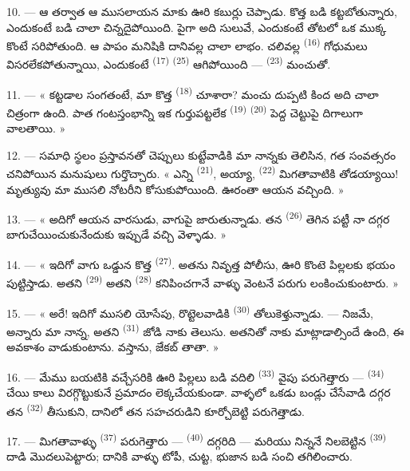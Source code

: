 10. --- ఆ తర్వాత ఆ ముసలాయన మాకు ఊరి కబుర్లు చెప్పాడు. కొత్త బడి కట్టబోతున్నారు, ఎందుకంటే
 బడి చాలా చిన్నదైపోయింది. పైగా అది సులువే, ఎందుకంటే
 తోటలో ఒక ముక్క కొంటే సరిపోతుంది. ఆ పాపం మనిషికి దానివల్ల చాలా లాభం.
చలివల్ల  \textsuperscript{(16)}  గోధుమలు
విసరలేకపోతున్నాయి, ఎందుకంటే  \textsuperscript{(17)} 
\textsuperscript{(25)} ఆగిపోయింది —  \textsuperscript{(23)} మంచుతో.

11. --- « కట్టడాల సంగతంటే, మా కొత్త  \textsuperscript{(18)} చూశారా? మంచు దుప్పటి
కింద అది చాలా చిత్రంగా ఉంది. పాత గంటస్తంభాన్ని ఇక గుర్తుపట్టలేక 
\textsuperscript{(19)}  \textsuperscript{(20)} పెద్ద చెట్టుపై దిగాలుగా
వాలతాయి. »

12. --- సమాధి స్థలం ప్రస్తావనతో చెప్పులు కుట్టేవాడికి మా నాన్నకు తెలిసిన, గత సంవత్సరం చనిపోయిన
మనుషులు గుర్తొచ్చారు. « ఎన్ని  \textsuperscript{(21)}, అయ్యా,
 \textsuperscript{(22)} మిగతావాటికి తోడయ్యాయి! మృత్యువు మా ముసలి నోటరీని
కోసుకుపోయింది. ఊరంతా ఆయన  వచ్చింది. »

13. --- « అదిగో ఆయన వారసుడు, వాగుపై జారుతున్నాడు. తన  \textsuperscript{(26)}
తెగిన పట్టీ నా దగ్గర బాగుచేయించుకునేందుకు ఇప్పుడే వచ్చి వెళ్ళాడు. »

14. --- « ఇదిగో వాగు ఒడ్డున కొత్త  \textsuperscript{(27)}. అతను నివృత్త పోలీసు,
ఊరి కొంటె పిల్లలకు భయం పుట్టిస్తాడు. అతని  \textsuperscript{(29)} అతని
 \textsuperscript{(28)} కనిపించగానే వాళ్ళు వెంటనే పరుగు లంకించుకుంటారు. »

15. --- « అరే! ఇదిగో ముసలి యోసేపు, రొట్టెలవాడికి  \textsuperscript{(30)}
తోలుకెళ్తున్నాడు. --- నిజమే, అన్నారు మా నాన్న, అతని  \textsuperscript{(31)}
జోడి నాకు తెలుసు. అతనితో నాకు మాట్లాడాల్సిందే ఉంది, ఈ అవకాశం వాడుకుంటాను. వస్తాను, జేకబ్ తాతా.
»

16. --- మేము బయటికి వచ్చేసరికి ఊరి పిల్లలు బడి వదిలి 
\textsuperscript{(33)} వైపు పరుగెత్తారు —  \textsuperscript{(34)} చేయి కాలు
విరగ్గొట్టుకునే ప్రమాదం లెక్కచేయకుండా. వాళ్ళలో ఒకడు బండ్లు చేసేవాడి దగ్గర తన
 \textsuperscript{(32)} తీసుకుని, దానిలో తన సహచరుడిని కూర్చోబెట్టి
పరుగెత్తాడు.

17. --- మిగతావాళ్ళు  \textsuperscript{(37)} పరుగెత్తారు —
 \textsuperscript{(40)} దగ్గరిది — మరియు నిన్ననే నిలబెట్టిన
 \textsuperscript{(39)} దాడి మొదలుపెట్టారు; దానికి వాళ్ళు టోపీ, చుట్ట,
భుజాన బడి సంచి తగిలించారు.

